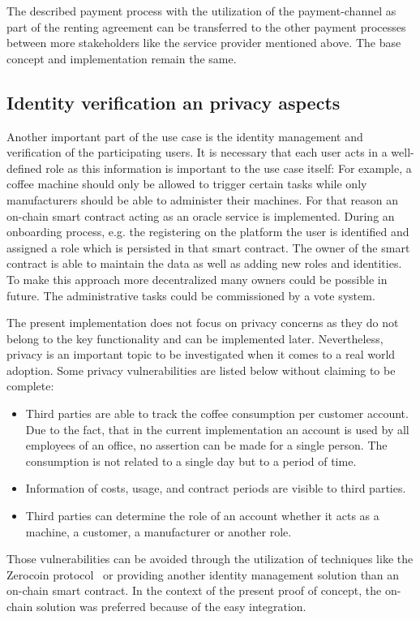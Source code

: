 \documentclass[conference]{IEEEtran}
\begin{document}
The described payment process with the utilization of the payment-channel as part of the renting agreement can be transferred to the other payment processes between more stakeholders like the service provider mentioned above. The base concept and implementation remain the same.

%
\subsection{Identity verification an privacy aspects}

Another important part of the use case is the identity management and verification of the participating users. It is necessary that each user acts in a well-defined role as this information is important to the use case itself: For example, a coffee machine should only be allowed to trigger certain tasks while only manufacturers should be able to administer their machines. For that reason an on-chain smart contract acting as an oracle service is implemented. During an onboarding process, e.g. the registering on the platform the user is identified and assigned a role which is persisted in that smart contract. The owner of the smart contract is able to maintain the data as well as adding new roles and identities. To make this approach more decentralized many owners could be possible in future. The administrative tasks could be commissioned by a vote system.

The present implementation does not focus on privacy concerns as they do not belong to the key functionality and can be implemented later. Nevertheless, privacy is an important topic to be investigated when it comes to a real world adoption. Some privacy vulnerabilities are listed below without claiming to be complete:

\begin{itemize}
\item Third parties are able to track the coffee consumption per customer account. Due to the fact, that in the current implementation an account is used by all employees of an office, no assertion can be made for a single person. The consumption is not related to a single day but to a period of time.
\item Information of costs, usage, and contract periods are visible to third parties.
\item Third parties can determine the role of an account whether it acts as a machine, a customer, a manufacturer or another role.
\end{itemize}
Those vulnerabilities can be avoided through the utilization of techniques like the Zerocoin protocol~\cite{zerocoin2013} or providing another identity management solution than an on-chain smart contract. In the context of the present proof of concept, the on-chain solution was preferred because of the easy integration.
\end{document}
